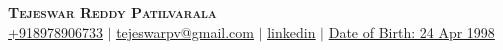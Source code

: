 \documentclass[a0paper,11pt]{article}
\begin{document}

\begin{center}
    \textbf{\Huge \scshape Tejeswar Reddy Patilvarala } \\ \vspace{0.5pt}
    \href{tel:+918978906733}{\underline{+918978906733}} $|$ 
    \href{mailto:tejeswarpv@gmail.com}{\underline{tejeswarpv@gmail.com}} $|$ 
    \href{https://www.linkedin.com/in/teja2404/}{\underline{linkedin}} $|$
    \href{}{{Date of Birth: 24 Apr 1998}}
  
\end{center}








% 






\end{document}
